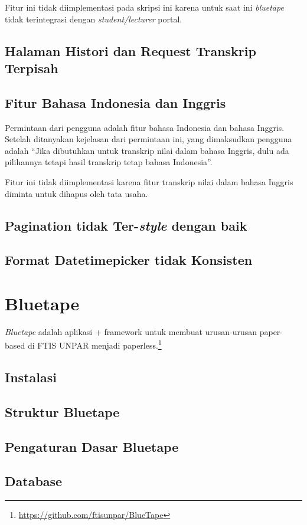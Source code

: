 Fitur ini tidak diimplementasi pada skripsi ini karena untuk saat ini \textit{bluetape} tidak terintegrasi dengan \textit{student/lecturer} portal.

\subsection{Halaman Histori dan Request Transkrip Terpisah}
\subsection{Fitur Bahasa Indonesia dan Inggris}
Permintaan dari pengguna adalah fitur bahasa Indonesia dan bahasa Inggris. Setelah ditanyakan kejelasan dari permintaan ini, yang dimaksudkan pengguna adalah ``Jika dibutuhkan untuk transkrip nilai dalam bahasa Inggris, dulu ada pilihannya tetapi hasil transkrip tetap bahasa Indonesia''.

Fitur ini tidak diimplementasi karena fitur transkrip nilai dalam bahasa Inggris diminta untuk dihapus oleh tata usaha.
\subsection{Pagination tidak Ter-\textit{style} dengan baik}
\subsection{Format Datetimepicker tidak Konsisten}

\section{Bluetape}

\textit{Bluetape} adalah aplikasi + framework untuk membuat urusan-urusan paper-based di FTIS UNPAR menjadi paperless.\footnote{\url{https://github.com/ftisunpar/BlueTape}}

\subsection{Instalasi}

\subsection{Struktur Bluetape}

\subsection{Pengaturan Dasar Bluetape}

\subsection{Database}